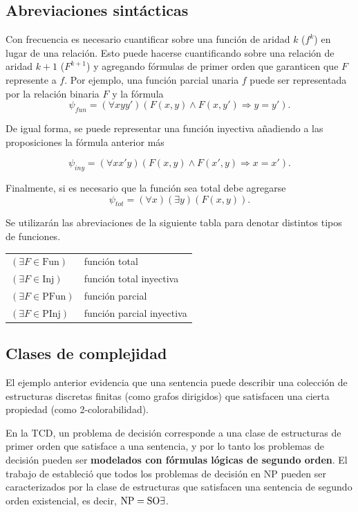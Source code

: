 \subsection{Abreviaciones sintácticas}
Con frecuencia es necesario cuantificar sobre una función de aridad $k$ ($f^k$)
en lugar de una relación. Esto puede hacerse cuantificando sobre una relación de
aridad $k+1$ ($F^{k+1}$) y agregando fórmulas de primer orden que garanticen
que $F$ represente a $f$. Por ejemplo, una función parcial unaria $f$ puede ser
representada por la relación binaria $F$ y la fórmula
\[ \psi_{fun} = (\forall xyy')(F(x, y) \land F(x, y') \Rightarrow y = y'). \]

De igual forma, se puede representar una función inyectiva añadiendo a las
proposiciones la fórmula anterior más

\[ \psi_{iny} = (\forall xx'y)(F(x, y) \land F(x', y) \Rightarrow x = x'). \]

Finalmente, si es necesario que la función sea total debe agregarse
\[ \psi_{tot} = (\forall x)(\exists y)(F(x, y)). \]

Se utilizarán las abreviaciones de la siguiente tabla para denotar distintos
tipos de funciones.

\begin{tabular}{ll}
$(\exists F \in \text{Fun})$ & función total\\
$(\exists F \in \text{Inj})$ & función total inyectiva\\
$(\exists F \in \text{PFun})$ & función parcial\\
$(\exists F \in \text{PInj})$ & función parcial inyectiva\\
\end{tabular}

\subsection{Clases de complejidad}
El ejemplo anterior evidencia que una sentencia puede describir una colección
de estructuras discretas finitas (como grafos dirigidos) que satisfacen
una cierta propiedad (como 2-colorabilidad). 

En la TCD, un problema de decisión corresponde a una clase de estructuras de
primer orden que satisface a una sentencia, y por lo tanto los problemas de
decisión pueden ser \textbf{modelados con fórmulas lógicas de segundo orden}.
El trabajo de \cite{fagin:spectra} estableció que todos los problemas de
decisión en NP pueden ser caracterizados por la clase de estructuras que
satisfacen una sentencia de segundo orden existencial, es decir,
$\text{NP}=\text{SO}\exists$.

